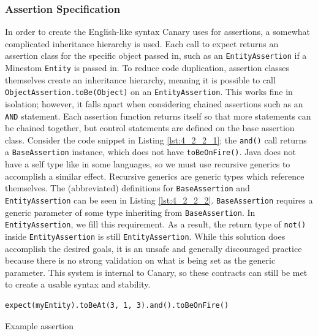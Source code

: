 \documentclass[12pt]{article}
\def\code#1{\texttt{#1}}
\begin{document}
\begin{onehalfspacing}
\subsubsection{Assertion Specification}

In order to create the English-like syntax Canary uses for assertions, a
somewhat complicated inheritance hierarchy is used. Each call to expect
returns an assertion class for the specific object passed in, such as an
\code{EntityAssertion} if a Minestom \code{Entity} is passed in. To reduce code
duplication, assertion classes themselves create an inheritance
hierarchy, meaning it is possible to call \code{ObjectAssertion.toBe(Object)}
on an \code{EntityAssertion}. This works fine in isolation; however, it falls
apart when considering chained assertions such as an \code{AND} statement. Each
assertion function returns itself so that more statements can be chained
together, but control statements are defined on the base assertion
class. Consider the code snippet in Listing \ref{lst:4_2_2_1}; the \code{and()} call
returns a \code{BaseAssertion} instance, which does not have \code{toBeOnFire()}.
Java does not have a self type like in some languages, so we must use
recursive generics to accomplish a similar effect. Recursive generics
are generic types which reference themselves. The (abbreviated)
definitions for \code{BaseAssertion} and \code{EntityAssertion} can be seen in
Listing \ref{lst:4_2_2_2}. \code{BaseAssertion} requires a generic parameter of some type
inheriting from \code{BaseAssertion}. In \code{EntityAssertion}, we fill this
requirement. As a result, the return type of \code{not()} inside
\code{EntityAssertion} is still \code{EntityAssertion}. While this solution does
accomplish the desired goals, it is an unsafe and generally discouraged
practice because there is no strong validation on what is being set as
the generic parameter. This system is internal to Canary, so these
contracts can still be met to create a usable syntax and stability.


\begin{listing}[H]
\begin{verbatim}
expect(myEntity).toBeAt(3, 1, 3).and().toBeOnFire()
\end{verbatim}
\caption{Example assertion}
\label{lst:4_2_2_1}
\end{listing}




\end{onehalfspacing}
\end{document}
